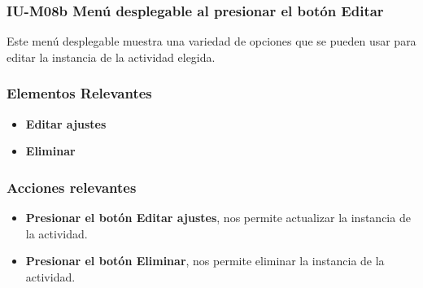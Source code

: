 
\subsubsection{IU-M08b Menú desplegable al presionar el botón Editar}

 Este menú desplegable muestra una variedad de opciones que se pueden usar para editar la instancia de la actividad elegida.


\subsubsection{Elementos Relevantes}

    \begin{itemize}
    \item {\bf Editar ajustes}
    \item {\bf Eliminar}

    \end{itemize}

\subsubsection{Acciones relevantes}

    \begin{itemize}
    \item {\bf Presionar el botón Editar ajustes}, nos permite actualizar la instancia de la actividad.
    \item {\bf Presionar el botón Eliminar}, nos permite eliminar la instancia de la actividad.
    \end{itemize}

\clearpage

